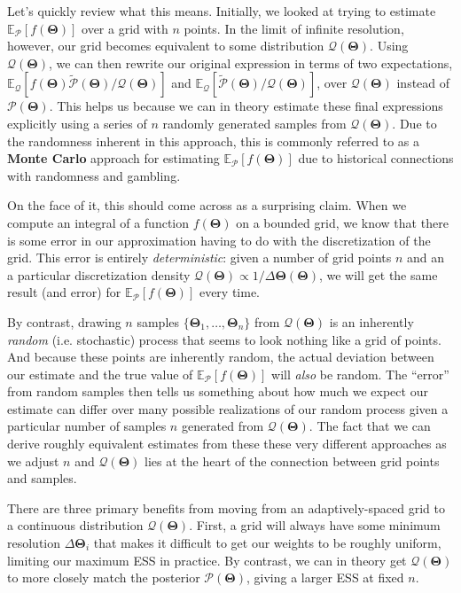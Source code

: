 \documentclass[12pt, titlepage]{article}
\newcommand{\meanwrt}[2]{\ensuremath{\mathbb{E}_{{#2}}\left[{#1}\right]}}
\newcommand{\params}{\ensuremath{\boldsymbol\Theta}}
\newcommand{\posterior}{\ensuremath{\mathcal{P}}}
\newcommand{\proposal}{\ensuremath{\mathcal{Q}}}
\begin{document}
Let's quickly review what this means. Initially,
we looked at trying to estimate $\meanwrt{f(\params)}{\posterior}$ over a grid
with $n$ points. In the limit of infinite resolution, however, our grid becomes
equivalent to some distribution $\proposal(\params)$. Using $\proposal(\params)$,
we can then rewrite our original expression in terms of two expectations,
$\meanwrt{f(\params) \tilde{\posterior}(\params)/\proposal(\params)}{\proposal}$
and $\meanwrt{\tilde{\posterior}(\params)/\proposal(\params)}{\proposal}$, over
$\proposal(\params)$ instead of $\posterior(\params)$.
This helps us because we can in theory estimate these final expressions
explicitly using a series of $n$ randomly generated samples from
$\proposal(\params)$. Due to the randomness inherent in this approach, 
this is commonly referred to as a \textbf{Monte Carlo} approach for estimating
$\meanwrt{f(\params)}{\posterior}$ due to historical connections with
randomness and gambling.

On the face of it, this should come across as a surprising claim. When we
compute an integral of a function $f(\params)$ on a bounded grid, we
know that there is some error in our approximation having to do with the
discretization of the grid. This error is entirely \textit{deterministic}:
given a number of grid points $n$ and an a particular discretization density
$\proposal(\params) \propto 1/\Delta\params(\params)$, we will get the
same result (and error) for $\meanwrt{f(\params)}{\posterior}$ every time.

By contrast, drawing $n$ samples $\{\params_1,\dots,\params_n\}$
from $\proposal(\params)$ is an inherently \textit{random} (i.e. stochastic) 
process that seems to look nothing like a
grid of points. And because these points are inherently random,
the actual deviation between our estimate and the true value of
$\meanwrt{f(\params)}{\posterior}$ will \textit{also} be random.
The ``error'' from random samples then tells us something about
how much we expect our estimate can differ over many possible
realizations of our random process given a particular number of samples
$n$ generated from $\proposal(\params)$. The fact that we can derive
roughly equivalent estimates from these these very different
approaches as we adjust $n$ and $\proposal(\params)$ lies at the heart of the
connection between grid points and samples.

There are three primary benefits from moving from an adaptively-spaced grid
to a continuous distribution $\proposal(\params)$.
First, a grid will always have some minimum 
resolution $\Delta \params_i$ that makes it difficult
to get our weights to be roughly uniform, limiting our maximum
ESS in practice. By contrast, we can in theory get
$\proposal(\params)$ to more closely match the posterior $\posterior(\params)$,
giving a larger ESS at fixed $n$.
\end{document}
